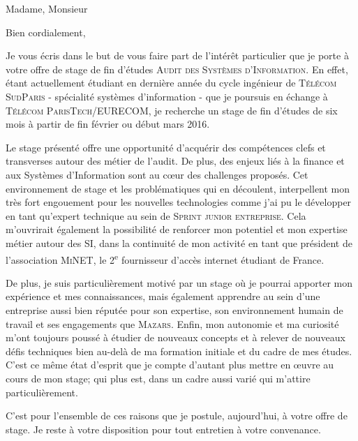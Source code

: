 \documentclass[10pt,a4paper,roman]{moderncv} %
\begin{document}
\date{23 Novembre 2015} %
\opening{Madame, Monsieur} %

\closing{Bien cordialement,} %


\makelettertitle %


\quad \quad Je vous écris dans le but de vous faire part de l'intérêt particulier que je porte à votre offre de stage de fin d'études
\textsc{Audit des Systèmes d’Information}. En effet, étant actuellement étudiant en dernière année du cycle
ingénieur de \textsc{Télécom SudParis} - spécialité systèmes d'information - que je poursuis en échange à
\textsc{Télécom ParisTech}/\textsc{EURECOM}, je recherche un stage de fin d’études de six mois à partir de fin février ou début mars 2016.

\quad \quad Le stage présenté offre une opportunité d'acquérir des compétences clefs et transverses autour des métier de l'audit.
De plus, des enjeux liés à la finance et aux Systèmes d’Information sont au c\oe ur des challenges proposés.
Cet environnement de stage et les problématiques qui en découlent, interpellent mon très fort engouement pour les nouvelles
technologies comme j'ai pu le développer en tant qu'expert technique au sein de \textsc{Sprint junior entreprise}.
Cela m'ouvrirait également la possibilité de renforcer mon potentiel et mon expertise métier autour des SI, dans la continuité de mon
activité en tant que président de l'association \textsc{MiNET}, le 2\textsuperscript{e} fournisseur d'accès internet étudiant de France.

\quad \quad De plus, je suis particulièrement motivé par un stage où je pourrai apporter mon expérience et mes connaissances, mais également
apprendre au sein d'une entreprise aussi bien réputée pour son expertise, son environnement humain de travail et ses engagements que \textsc{Mazars}.
Enfin, mon autonomie et ma curiosité m'ont toujours poussé à étudier de nouveaux concepts et à relever de nouveaux défis techniques bien au-delà de ma
formation initiale et du cadre de mes études. C'est ce même état d'esprit que je compte d'autant plus mettre en \oe uvre au cours de mon stage;
qui plus est, dans un cadre aussi varié qui m'attire particulièrement.

\quad \quad C’est pour l’ensemble de ces raisons que je postule, aujourd'hui, à votre offre de stage. Je reste à votre disposition pour
tout entretien à votre convenance.
\\[0.7cm]


\makeletterclosing %

\end{document}

